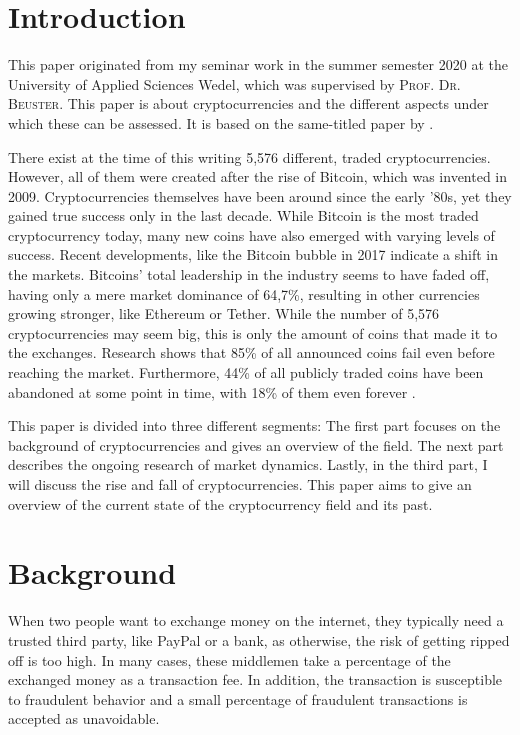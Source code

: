 \documentclass[11pt,a4paper,compsoc,conference]{IEEEtran}
\begin{document}
\section*{Introduction}
This paper originated from my seminar work in the summer semester 2020 at the University of Applied Sciences Wedel, which was supervised by \textsc{Prof. Dr. Beuster}. This paper is about cryptocurrencies and the different aspects under which these can be assessed. It is based on the same-titled paper by \citet{Feder2018TheRA}.  

There exist at the time of this writing 5,576 different, traded cryptocurrencies. However, all of them were created after the rise of Bitcoin, which was invented in 2009. Cryptocurrencies themselves have been around since the early '80s, yet they gained true success only in the last decade. While Bitcoin is the most traded cryptocurrency today, many new coins have also emerged with varying levels of success. Recent developments, like the Bitcoin bubble in 2017 indicate a shift in the markets. Bitcoins' total leadership in the industry seems to have faded off, having only a mere market dominance of 64,7\%, resulting in other currencies growing stronger, like Ethereum or Tether. While the number of 5,576 cryptocurrencies may seem big, this is only the amount of coins that made it to the exchanges. Research shows that 85\% of all announced coins fail even before reaching the market. Furthermore, 44\% of all publicly traded coins have been abandoned at some point in time, with 18\% of them even forever \citep{Feder2018TheRA}. 

This paper is divided into three different segments: The first part focuses on the background of cryptocurrencies and gives an overview of the field. The next part describes the ongoing research of market dynamics. Lastly, in the third part, I will discuss the rise and fall of cryptocurrencies. This paper aims to give an overview of the current state of the cryptocurrency field and its past.
\tableofcontents
\pagebreak


\section{Background}\label{background}

When two people want to exchange money on the internet, they typically need a trusted third party, like PayPal or a bank, as otherwise, the risk of getting ripped off is too high. In many cases, these middlemen take a percentage of the exchanged money as a transaction fee. In addition, the transaction is susceptible to fraudulent behavior and a small percentage of fraudulent transactions is accepted as unavoidable.
\end{document}
